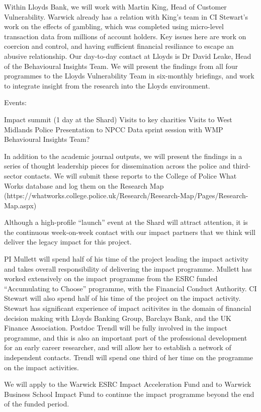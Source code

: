 Within Lloyds Bank, we will work with Martin King, Head of Customer Vulnerability. Warwick already has a relation with King's team in CI Stewart's work on the effects of gambling, which was completed using micro-level transaction data from millions of account holders. Key issues here are work on coercion and control, and having sufficient financial resiliance to escape an abusive relationship. Our day-to-day contact at Lloyds is Dr David Leake, Head of the Behavioural Insights Team. We will present the findings from all four programmes to the Lloyds Vulnerability Team in six-monthly briefings, and work to integrate insight from the research into the Lloyds environment. 


Events:

Impact summit (1 day at the Shard)
Visits to key charities
Visits to West Midlands Police
Presentation to NPCC
Data sprint session with WMP Behavioural Insights Team?


In addition to the academic journal outputs, we will present the findings in a series of thought leadership pieces for dissemination across the police and third-sector contacts. We will submit these reports to the College of Police What Works database and log them on the Research Map (https://whatworks.college.police.uk/Research/Research-Map/Pages/Research-Map.aspx)

Although a high-profile ``launch'' event at the Shard will attract attention, it is the continuous week-on-week contact with our impact partners that we think will deliver the legacy impact for this project.




PI Mullett will spend half of his time of the project leading the impact activity and takes overall responsibility of delivering the impact programme. Mullett has worked extensively on the impact programme from the ESRC funded ``Accumulating to Choose'' programme, with the Financial Conduct Authority. CI Stewart will also spend half of his time of the project on the impact activity. Stewart has significant experience of impact acitivites in the domain of financial decision making with Lloyds Banking Group, Barclays Bank, and the UK Finance Association. Postdoc Trendl will be fully involved in the impact programme, and this is also an important part of the professional development for an early career researcher, and will allow her to establish a network of independent contacts. Trendl will spend one third of her time on the programme on the impact activities.

We will apply to the Warwick ESRC Impact Acceleration Fund and to Warwick Business School Impact Fund to continue the impact programme beyond the end of the funded period. 





